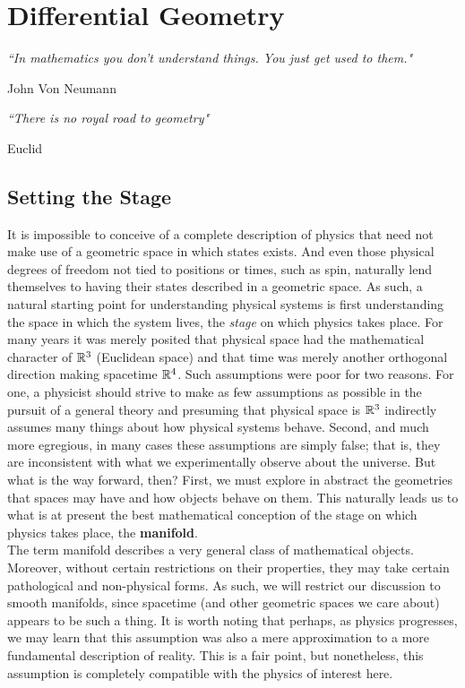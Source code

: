 \chapter{Differential Geometry}
\epigraph{\textit{``In mathematics you don't understand things. You just get used to them."}}{John Von Neumann}
\epigraph{\textit{``There is no royal road to geometry"}}{Euclid}
\section*{Setting the Stage}

It is impossible to conceive of a complete description of physics that need not make use of a geometric space in which states exists.  And even those physical degrees of freedom not tied to positions or times, such as spin, naturally lend themselves to having their states described in a geometric space.  As such, a natural starting point for understanding physical systems is first understanding the space in which the system lives, the \textit{stage} on which physics takes place.  For many years it was merely posited that physical space had the mathematical character of $\mathbb{R}^3$ (Euclidean space) and that time was merely another orthogonal direction making spacetime $\mathbb{R}^4$.  Such assumptions were poor for two reasons.  For one, a physicist should strive to make as few assumptions as possible in the pursuit of a general theory and presuming that physical space is $\mathbb{R}^3$ indirectly assumes many things about how physical systems behave. Second, and much more egregious, in many cases these assumptions are simply false; that is, they are inconsistent with what we experimentally observe about the universe.  But what is the way forward, then?  First, we must explore in abstract the geometries that spaces may have and how objects behave on them.  This naturally leads us to what is at present the best mathematical conception of the stage on which physics takes place, the \textbf{manifold}.\\

The term manifold describes a very general class of mathematical objects.  Moreover, without certain restrictions on their properties, they may take certain pathological and non-physical forms.  As such, we will restrict our discussion to smooth manifolds, since spacetime (and other geometric spaces we care about) appears to be such a thing.  It is worth noting that perhaps, as physics progresses, we may learn that this assumption was also a mere approximation to a more fundamental description of reality.  This is a fair point, but nonetheless, this assumption is completely compatible with the physics of interest here. \\


